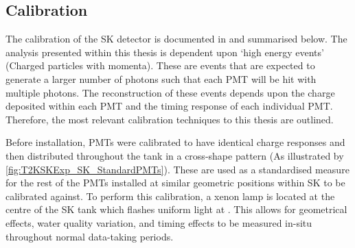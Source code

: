 \subsection{Calibration}
\label{subsec:T2KSKExp_SKCalibration}

The calibration of the SK detector is documented in \cite{Abe_2014_SKCalib} and summarised below. The analysis presented within this thesis is dependent upon `high energy events' (Charged particles with  momenta). These are events that are expected to generate a larger number of photons such that each PMT will be hit with multiple photons. The reconstruction of these events depends upon the charge deposited within each PMT and the timing response of each individual PMT. Therefore, the most relevant calibration techniques to this thesis are outlined.

Before installation,  PMTs were calibrated to have identical charge responses and then distributed throughout the tank in a cross-shape pattern (As illustrated by \autoref{fig:T2KSKExp_SK_StandardPMTs}). These are used as a standardised measure for the rest of the PMTs installed at similar geometric positions within SK to be calibrated against.
To perform this calibration, a xenon lamp is located at the centre of the SK tank which flashes uniform light at . This allows for geometrical effects, water quality variation, and timing effects to be measured in-situ throughout normal data-taking periods.

